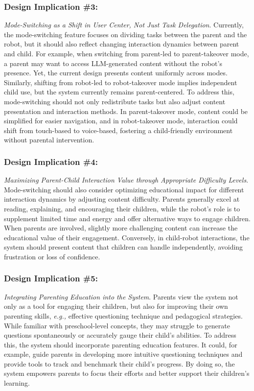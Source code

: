 \subsubsection{Design Implication \#3: } \textit{Mode-Switching as a Shift in User Center, Not Just Task Delegation}.
Currently, the mode-switching feature focuses on dividing tasks between the parent and the robot, but it should also reflect changing interaction dynamics between parent and child. For example, when switching from parent-led to parent-takeover mode, a parent may want to access LLM-generated content without the robot's presence. Yet, the current design presents content uniformly across modes. Similarly, shifting from robot-led to robot-takeover mode implies independent child use, but the system currently remains parent-centered. To address this, mode-switching should not only redistribute tasks but also adjust content presentation and interaction methods. In parent-takeover mode, content could be simplified for easier navigation, and in robot-takeover mode, interaction could shift from touch-based to voice-based, fostering a child-friendly environment without parental intervention.

\subsubsection{Design Implication \#4: } \textit{Maximizing Parent-Child Interaction Value through Appropriate Difficulty Levels}.
Mode-switching should also consider optimizing educational impact for different interaction dynamics by adjusting content difficulty. Parents generally excel at reading, explaining, and encouraging their children, while the robot's role is to supplement limited time and energy and offer alternative ways to engage children. When parents are involved, slightly more challenging content can increase the educational value of their engagement. Conversely, in child-robot interactions, the system should present content that children can handle independently, avoiding frustration or loss of confidence.

\subsubsection{Design Implication \#5: } \textit{Integrating Parenting Education into the System}.
Parents view the system not only as a tool for engaging their children, but also for improving their own parenting skills, \textit{e.g.,} effective questioning technique and pedagogical strategies. While familiar with preschool-level concepts, they may struggle to generate questions spontaneously or accurately gauge their child's abilities. To address this, the system should incorporate parenting education features. It could, for example, guide parents in developing more intuitive questioning techniques and provide tools to track and benchmark their child's progress. By doing so, the system empowers parents to focus their efforts and better support their children's learning.
